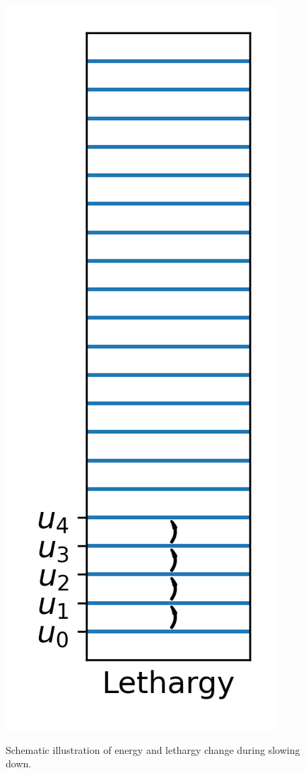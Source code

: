 \begin{figure}[ht!]
{\includegraphics[scale=0.74] {figures/03-lethargychange.png}}\protect
\caption{\label{fig:lethargy} \footnotesize{Schematic illustration of energy and lethargy change during slowing down.}}
\end{figure}

